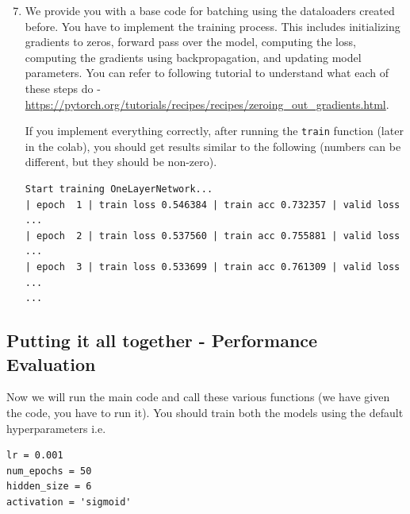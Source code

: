 \begin{enumerate}
\setcounter{enumi}{6}

\item {}
We provide you with a base code for batching using the dataloaders created before. You have to implement the training process. This includes initializing gradients to zeros, forward pass over the model, computing the loss, computing the gradients using backpropagation, and updating model parameters. You can refer to following tutorial to understand what each of these steps do - \url{https://pytorch.org/tutorials/recipes/recipes/zeroing_out_gradients.html}.

If you implement everything correctly, after running the \verb|train| function (later in the colab), you should get results similar to the following (numbers can be different, but they should be non-zero). 

\begin{verbatim}
Start training OneLayerNetwork...
| epoch  1 | train loss 0.546384 | train acc 0.732357 | valid loss ...
| epoch  2 | train loss 0.537560 | train acc 0.755881 | valid loss ...
| epoch  3 | train loss 0.533699 | train acc 0.761309 | valid loss ...
...
\end{verbatim}

\end{enumerate}

\subsection{Putting it all together - Performance Evaluation }

Now we will run the main code and call these various functions (we have given the code, you have to run it). You should train both the models using the default hyperparameters i.e.

\begin{verbatim}
lr = 0.001
num_epochs = 50
hidden_size = 6
activation = 'sigmoid'
\end{verbatim}

